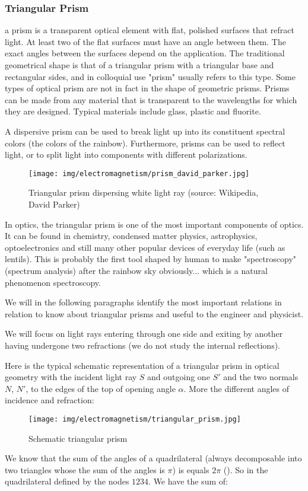 	\subsubsection{Triangular Prism}
	 a prism is a transparent optical element with flat, polished surfaces that refract light. At least two of the flat surfaces must have an angle between them. The exact angles between the surfaces depend on the application. The traditional geometrical shape is that of a triangular prism with a triangular base and rectangular sides, and in colloquial use "prism" usually refers to this type. Some types of optical prism are not in fact in the shape of geometric prisms. Prisms can be made from any material that is transparent to the wavelengths for which they are designed. Typical materials include glass, plastic and fluorite.

	A dispersive prism can be used to break light up into its constituent spectral colors (the colors of the rainbow). Furthermore, prisms can be used to reflect light, or to split light into components with different polarizations.
	\begin{figure}[H]
		\centering
		\texttt{[image: img/electromagnetism/prism\_david\_parker.jpg]}
		\caption[Triangular prism dispersing white light ray]{Triangular prism dispersing white light ray (source: Wikipedia, David Parker)}
	\end{figure}
	In optics, the triangular prism is one of the most important components of optics. It can be found in chemistry, condensed matter physics, astrophysics, optoelectronics and still many other popular devices of everyday life (such as lentils). This is probably the first tool shaped by human to make "spectroscopy" (spectrum analysis) after the rainbow sky obviously... which is a natural phenomenon spectroscopy.
	
	We will in the following paragraphs identify the most important relations in relation to know about triangular prisms and useful to the engineer and physicist.

	We will focus on light rays entering through one side and exiting by another having undergone two refractions (we do not study the internal reflections).

	Here is the typical schematic representation of a triangular prism in optical geometry with the incident light ray $S$ and outgoing one $S'$ and the two normals $N$, $N'$, to the edges of the top of opening angle $\alpha$. More the different angles of incidence and refraction:
	\begin{figure}[H]
		\centering
		\texttt{[image: img/electromagnetism/triangular\_prism.jpg]}
		\caption[]{Schematic triangular prism}
	\end{figure}
	We know that the sum of the angles of a quadrilateral (always decomposable into two triangles whose the sum of the angles is $\pi$) is equals $2\pi$ (). So in the quadrilateral defined by the nodes $1234$. We have the sum of:
	
